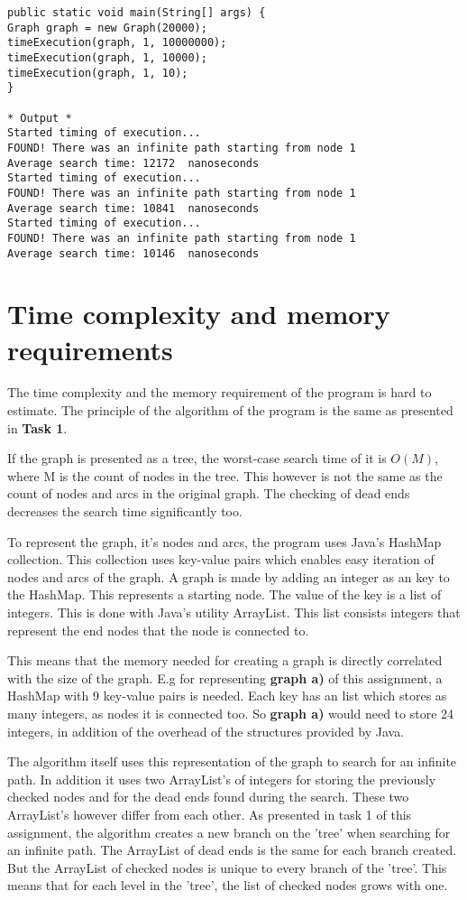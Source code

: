 \documentclass[]{article}
\begin{document}
\begin{lstlisting}
public static void main(String[] args) {
Graph graph = new Graph(20000);
timeExecution(graph, 1, 10000000);
timeExecution(graph, 1, 10000);
timeExecution(graph, 1, 10);
}

* Output *
Started timing of execution...
FOUND! There was an infinite path starting from node 1
Average search time: 12172  nanoseconds
Started timing of execution...
FOUND! There was an infinite path starting from node 1
Average search time: 10841  nanoseconds
Started timing of execution...
FOUND! There was an infinite path starting from node 1
Average search time: 10146  nanoseconds
\end{lstlisting}

\newpage

\section*{Time complexity and memory requirements}

The time complexity and the memory requirement of the program is hard to estimate. The principle of the algorithm of the program is the same as presented in \textbf{Task 1}. 

If the graph is presented as a tree, the worst-case search time of it is $O(M)$, where M is the count of nodes in the tree. This however is not the same as the count of nodes and arcs in the original graph. The checking of dead ends decreases the search time significantly too. 

To represent the graph, it's nodes and arcs, the program uses Java's HashMap collection. This collection uses key-value pairs which enables easy iteration of nodes and arcs of the graph. 
A graph is made by adding an integer as an key to the HashMap. This represents a starting node. The value of the key is a list of integers. This is done with Java's utility ArrayList. This list consists integers that represent the end nodes that the node is connected to. 

This means that the memory needed for creating a graph is directly correlated with the size of the graph. E.g for representing \textbf{graph a)} of this assignment, a HashMap with 9 key-value pairs is needed. Each key has an list which stores as many integers, as nodes it is connected too. So \textbf{graph a)} would need to store 24 integers, in addition of the overhead of the structures provided by Java. 

The algorithm itself uses this representation of the graph to search for an infinite path. In addition it uses two ArrayList's of integers for storing the previously checked nodes and for the dead ends found during the search. These two ArrayList's however differ from each other. As presented in task 1 of this assignment, the algorithm creates a new branch on the 'tree' when searching for an infinite path. The ArrayList of dead ends is the same for each branch created. But the ArrayList of checked nodes is unique to every branch of the 'tree'. This means that for each level in the 'tree', the list of checked nodes grows with one. 
\end{document}
